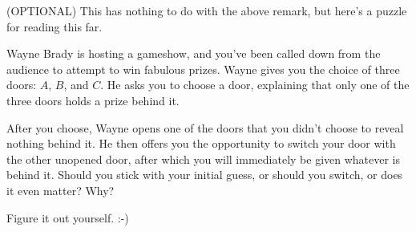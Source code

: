 \documentclass[letterpaper, twoside, 12pt]{book}
\begin{document}
\begin{problem}
  (OPTIONAL)
  This has nothing to do with the above remark, but here's a puzzle for
  reading this far.

  Wayne Brady is hosting a gameshow, and you've
  been called down from the audience to attempt to win fabulous prizes.
  Wayne gives you the choice of three doors: $A$, $B$, and $C$. He asks
  you to choose a door, explaining that only one of the three doors holds
  a prize behind it.

  After you choose, Wayne opens one of the doors that you didn't choose to
  reveal nothing behind it. He then offers you the opportunity to switch
  your door with the other unopened door, after which you will immediately
  be given whatever is behind it. Should you stick with your initial
  guess, or should you switch, or does it even matter? Why?
\end{problem}

          \begin{solution}
            Figure it out yourself. :-)
          \end{solution}
\end{document}
